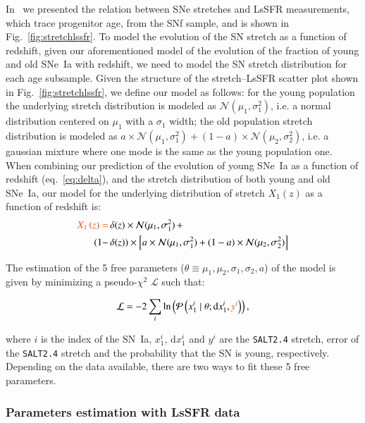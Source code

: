 \documentclass[]{aa} %
\newcommand{\nn}[1]{{\textcolor[rgb]{1, 0.27, 0}{#1}}}
\newcommand{\prob}[2]{\mathcal{P}\left( #1 \mid #2\right)}
\begin{document}
\nn{In~\cite{rigault2018} we presented the relation between SNe stretches and
LsSFR measurements, which trace progenitor age, from the SNf sample, and is
shown in Fig.~\ref{fig:stretchlssfr}}. To model the evolution of the SN stretch
as a function of redshift, given our aforementioned model of the evolution of
the fraction of young and old SNe~Ia with redshift, we need to model the SN
stretch distribution for each age subsample. Given the structure of the
stretch--LsSFR scatter plot shown in Fig.~\ref{fig:stretchlssfr}, we define our
model as follows: for the young population the underlying stretch distribution
is modeled as $\mathcal{N}(\mu_1, \sigma_1^2)$, i.e. a normal distribution
centered on $\mu_1$ with a $\sigma_1$ width; the old population stretch
distribution is modeled as $a\times \mathcal{N}(\mu_1, \sigma_1^2) + (1-a)\times
\mathcal{N}(\mu_2, \sigma_2^2)$, i.e. a gaussian mixture where one mode is the
same as the young population one. \nn{When combining our prediction of the
evolution of young SNe~Ia as a function of redshift (eq.~\ref{eq:delta}),
and the stretch distribution of both young and old SNe~Ia, our model for the
underlying distribution of stretch $X_1\left(z\right)$ as a function of
redshift is:}
\begin{align}
    \label{eq:stretchz}
    \nn{X_1\left(z \right) =
    } &\,\delta(z)\times\mathcal{N}(\mu_1,\sigma_1^2)\,+\nonumber\\
    (1-&\,\delta(z)) \times  \left[a\times\mathcal{N}(\mu_1,\sigma_1^2) +
    (1-a)\times\mathcal{N}(\mu_2,\sigma_2^2)\right]
\end{align}

The estimation of the 5 free parameters
($\theta\equiv{\mu_1,\mu_2,\sigma_1,\sigma_2,a}$) of the model is given by
minimizing a pseudo-$\chi^2$ $\mathcal{L}$ such that:

\begin{equation}
    \label{eq:likelihood}
    \mathcal{L} = -2 \sum_i \ln\left( \prob{x^{i}_{1}}{ \theta;
    \mathrm{d}x^{i}_{1}, \nn{y^i}}\right),
\end{equation}

\nn{where $i$ is the index of the SN~Ia, $x^{i}_{1}$, $\mathrm{d}x^{i}_{1}$ and
    $y^i$ are the \textsc{\texttt{SALT2.4}} stretch, error of the
    \textsc{\texttt{SALT2.4}} stretch and the probability that the SN is young,
    respectively. Depending on the data available, there are two ways to fit
these 5 free parameters}.

\subsubsection{\nn{Parameters estimation with LsSFR data}}
\label{sec:modelpy}
\end{document}
